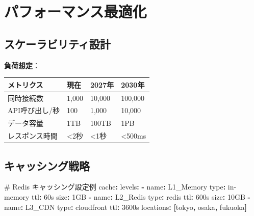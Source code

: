 \documentclass[
  a4paper,
  a4paper,
  11pt]{ltjsbook}
\newenvironment{Shaded}{\begin{snugshade}}{\end{snugshade}}
\newcommand{\AttributeTok}[1]{\textcolor[rgb]{0.40,0.45,0.13}{#1}}
\newcommand{\CommentTok}[1]{\textcolor[rgb]{0.37,0.37,0.37}{#1}}
\newcommand{\FunctionTok}[1]{\textcolor[rgb]{0.28,0.35,0.67}{#1}}
\newcommand{\KeywordTok}[1]{\textcolor[rgb]{0.00,0.23,0.31}{\textbf{#1}}}
\begin{document}
\section{パフォーマンス最適化}\label{ux30d1ux30d5ux30a9ux30fcux30deux30f3ux30b9ux6700ux9069ux5316}

\subsection{スケーラビリティ設計}\label{ux30b9ux30b1ux30fcux30e9ux30d3ux30eaux30c6ux30a3ux8a2dux8a08}

\textbf{負荷想定}：

\begin{longtable}[]{@{}llll@{}}
\toprule\noalign{}
メトリクス & 現在 & 2027年 & 2030年 \\
\midrule\noalign{}
\endhead
\bottomrule\noalign{}
\endlastfoot
同時接続数 & 1,000 & 10,000 & 100,000 \\
API呼び出し/秒 & 100 & 1,000 & 10,000 \\
データ容量 & 1TB & 100TB & 1PB \\
レスポンス時間 & \textless2秒 & \textless1秒 & \textless500ms \\
\end{longtable}

\subsection{キャッシング戦略}\label{ux30adux30e3ux30c3ux30b7ux30f3ux30b0ux6226ux7565}

\begin{Shaded}
\begin{Highlighting}[]
\CommentTok{\# Redis キャッシング設定例}
\FunctionTok{cache}\KeywordTok{:}
\AttributeTok{  }\FunctionTok{levels}\KeywordTok{:}
\AttributeTok{    }\KeywordTok{{-}}\AttributeTok{ }\FunctionTok{name}\KeywordTok{:}\AttributeTok{ L1\_Memory}
\AttributeTok{      }\FunctionTok{type}\KeywordTok{:}\AttributeTok{ in{-}memory}
\AttributeTok{      }\FunctionTok{ttl}\KeywordTok{:}\AttributeTok{ 60s}
\AttributeTok{      }\FunctionTok{size}\KeywordTok{:}\AttributeTok{ 1GB}
\AttributeTok{    }
\AttributeTok{    }\KeywordTok{{-}}\AttributeTok{ }\FunctionTok{name}\KeywordTok{:}\AttributeTok{ L2\_Redis}
\AttributeTok{      }\FunctionTok{type}\KeywordTok{:}\AttributeTok{ redis}
\AttributeTok{      }\FunctionTok{ttl}\KeywordTok{:}\AttributeTok{ 600s}
\AttributeTok{      }\FunctionTok{size}\KeywordTok{:}\AttributeTok{ 10GB}
\AttributeTok{      }
\AttributeTok{    }\KeywordTok{{-}}\AttributeTok{ }\FunctionTok{name}\KeywordTok{:}\AttributeTok{ L3\_CDN}
\AttributeTok{      }\FunctionTok{type}\KeywordTok{:}\AttributeTok{ cloudfront}
\AttributeTok{      }\FunctionTok{ttl}\KeywordTok{:}\AttributeTok{ 3600s}
\AttributeTok{      }\FunctionTok{locations}\KeywordTok{:}\AttributeTok{ }\KeywordTok{[}\AttributeTok{tokyo}\KeywordTok{,}\AttributeTok{ osaka}\KeywordTok{,}\AttributeTok{ fukuoka}\KeywordTok{]}
\end{Highlighting}
\end{Shaded}
\end{document}
